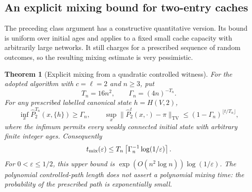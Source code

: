 \documentclass[11pt]{article}
\newtheorem{theorem}{Theorem}
\newcommand{\TV}{\mathrm{TV}}
\begin{document}
\subsection{An explicit mixing bound for two-entry caches}

The preceding class argument has a constructive quantitative version.
Its bound is uniform over initial ages and applies to a fixed small
cache capacity with arbitrarily large networks.
It still charges for a prescribed sequence of random outcomes, so
the resulting mixing estimate is very pessimistic.

\begin{theorem}[Explicit mixing from a quadratic controlled witness]
\label{thm:c2explicitmix}
For the adopted algorithm with $c=\ell=2$ and $n\ge3$, put
\[
 T_n=16n^2,\qquad \Gamma_n=(4n)^{-T_n}.
\]
For any prescribed labelled canonical state $h=H(V,2)$,
\[
 \inf_x\widehat P_2^{T_n}(x,\{h\})\ge\Gamma_n,
 \qquad
 \sup_x\|\widehat P_2^t(x,\cdot)-\pi\|_{\TV}
 \le(1-\Gamma_n)^{\lfloor t/T_n\rfloor},
\]
where the infimum permits every weakly connected initial
state with arbitrary finite integer ages.
Consequently
\[
 t_{\rm mix}(\varepsilon)
 \le T_n\left\lceil\Gamma_n^{-1}
                  \log(1/\varepsilon)\right\rceil.
\]
For $0<\varepsilon\le1/2$, this upper bound is
$\exp(O(n^2\log n))\log(1/\varepsilon)$.
The polynomial controlled-path length does not assert a
polynomial mixing time: the probability of the prescribed
path is exponentially small.
\end{theorem}
\end{document}
